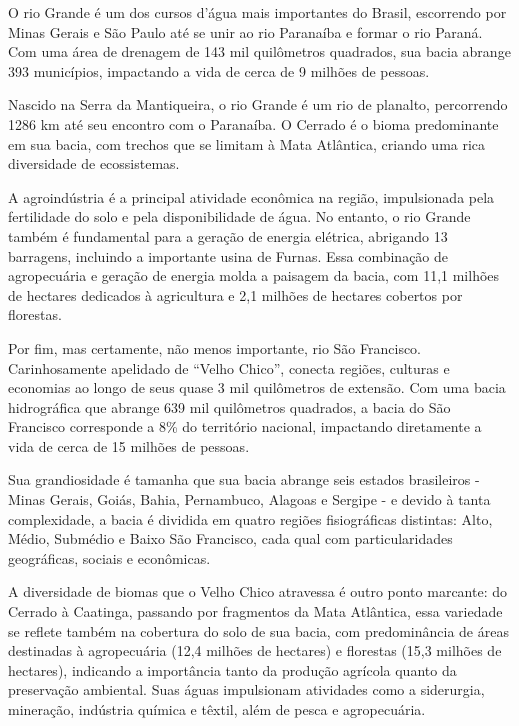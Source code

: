O rio Grande é um dos cursos d'água mais importantes do Brasil, escorrendo por Minas Gerais e São Paulo até se unir ao rio Paranaíba e formar o rio Paraná. Com uma área de drenagem de 143 mil quilômetros quadrados, sua bacia abrange 393 municípios, impactando a vida de cerca de 9 milhões de pessoas. 

Nascido na Serra da Mantiqueira, o rio Grande é um rio de planalto, percorrendo 1286 km até seu encontro com o Paranaíba. O Cerrado é o bioma predominante em sua bacia, com trechos que se limitam à Mata Atlântica, criando uma rica diversidade de ecossistemas.

A agroindústria é a principal atividade econômica na região, impulsionada pela fertilidade do solo e pela disponibilidade de água. No entanto, o rio Grande também é fundamental para a geração de energia elétrica, abrigando 13 barragens, incluindo a importante usina de Furnas. Essa combinação de agropecuária e geração de energia molda a paisagem da bacia, com 11,1 milhões de hectares dedicados à agricultura e 2,1 milhões de hectares cobertos por florestas.

Por fim, mas certamente, não menos importante, rio São Francisco. Carinhosamente apelidado de ``Velho Chico'', conecta regiões, culturas e economias ao longo de seus quase 3 mil quilômetros de extensão. Com uma bacia hidrográfica que abrange 639 mil quilômetros quadrados, a bacia do São Francisco corresponde a 8\% do território nacional, impactando diretamente a vida de cerca de 15 milhões de pessoas.

Sua grandiosidade é tamanha que sua bacia abrange seis estados brasileiros - Minas Gerais, Goiás, Bahia, Pernambuco, Alagoas e Sergipe - e devido à tanta complexidade, a bacia é dividida em quatro regiões fisiográficas distintas: Alto, Médio, Submédio e Baixo São Francisco, cada qual com particularidades geográficas, sociais e econômicas.

A diversidade de biomas que o Velho Chico atravessa é outro ponto marcante: do Cerrado à Caatinga, passando por fragmentos da Mata Atlântica, essa variedade se reflete também na cobertura do solo de sua bacia, com predominância de áreas destinadas à agropecuária (12,4 milhões de hectares) e florestas (15,3 milhões de hectares), indicando a importância tanto da produção agrícola quanto da preservação ambiental. Suas águas impulsionam atividades como a siderurgia, mineração, indústria química e têxtil, além de pesca e agropecuária.


